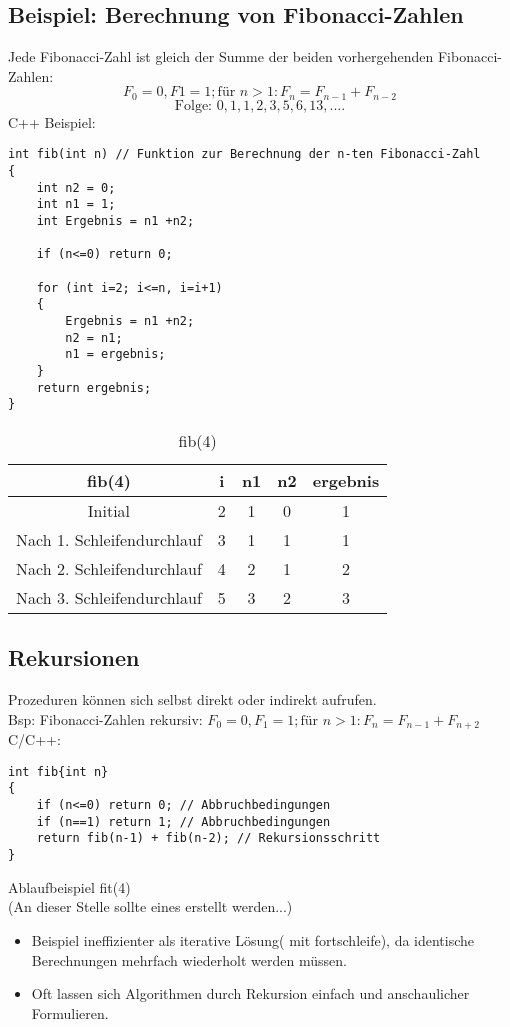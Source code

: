 \subsection{Beispiel: Berechnung von Fibonacci-Zahlen}
Jede Fibonacci-Zahl ist gleich der Summe der beiden vorhergehenden Fibonacci-Zahlen:
\[
F_0 = 0, F1 = 1; \mbox{für } n > 1: F_n = F_{n-1} + F_{n-2}
\]
\[
\mbox{Folge: } 0, 1, 1, 2, 3, 5, 6, 13, ....
\]
C++ Beispiel:
\begin{lstlisting}
int fib(int n) // Funktion zur Berechnung der n-ten Fibonacci-Zahl
{
	int n2 = 0;
	int n1 = 1;
	int Ergebnis = n1 +n2;
	
	if (n<=0) return 0;
	
	for (int i=2; i<=n, i=i+1)
	{
		Ergebnis = n1 +n2;
		n2 = n1;
		n1 = ergebnis;
	}
	return ergebnis;
}
\end{lstlisting}
\begin{table}[h]
	\caption[Beispiel fib(4)]{fib(4)}
	\begin{center}
	\begin{tabular}{c|c|c|c|c}
		fib(4) & i & n1 & n2 & ergebnis\\
		\hline
		Initial & 2 & 1 & 0 & 1 \\
		Nach 1. Schleifendurchlauf & 3 & 1 & 1 & 1 \\
		Nach 2. Schleifendurchlauf & 4 & 2 & 1 & 2 \\
		Nach 3. Schleifendurchlauf & 5 & 3 & 2 & 3 \\

	\end{tabular}
	\end{center}
\end{table}

\subsection{Rekursionen}
Prozeduren können sich selbst direkt oder indirekt aufrufen. \\
Bsp: Fibonacci-Zahlen rekursiv: $ F_0 = 0, F_1=1; \mbox{für } n>1: F_n = F_{n-1} + F_{n+2} $
C/C++:
\begin{lstlisting}
int fib{int n}
{
	if (n<=0) return 0; // Abbruchbedingungen
	if (n==1) return 1; // Abbruchbedingungen
	return fib(n-1) + fib(n-2); // Rekursionsschritt
}
\end{lstlisting}
Ablaufbeispiel fit(4) \\
(An dieser Stelle sollte eines erstellt werden...)\\
\begin{itemize}
\item Beispiel ineffizienter als iterative Lösung( mit fortschleife), da identische Berechnungen mehrfach wiederholt werden müssen.
\item Oft lassen sich Algorithmen durch Rekursion einfach und anschaulicher Formulieren.
\end{itemize}

